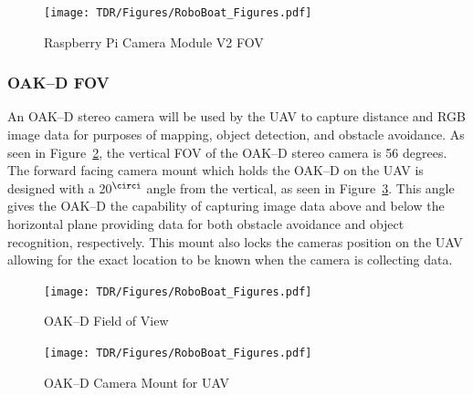 \documentclass[letterpaper, 12 pt, conference]{ieeeconf}
\begin{document}


\begin{figure}[tb]
\centering
\texttt{[image: TDR/Figures/RoboBoat\_Figures.pdf]}
\caption{Raspberry Pi Camera Module V2 FOV}
\label{fig:picamfov}
\end{figure}

\subsubsection{OAK--D FOV}
% 
An OAK--D stereo camera will be used by the UAV to capture distance and RGB image data for purposes of mapping, object detection, and obstacle avoidance. As seen in Figure~\ref{fig:oakdfov}, the vertical FOV of the OAK--D stereo camera is 56 degrees. The forward facing camera mount which holds the OAK--D on the UAV is designed with a 20$^{\circi}$ angle from the vertical, as seen in Figure~\ref{fig:cammount}. This angle gives the OAK--D the capability of capturing image data above and below the horizontal plane providing data for both obstacle avoidance and object recognition, respectively. This mount also locks the cameras position on the UAV allowing for the exact location to be known when the camera is collecting data.
%
\begin{figure}[tb]
\centering
\texttt{[image: TDR/Figures/RoboBoat\_Figures.pdf]}
\caption{OAK--D Field of View}
\label{fig:oakdfov}
\end{figure}
%
%
\begin{figure}[tb]
\centering
\texttt{[image: TDR/Figures/RoboBoat\_Figures.pdf]}
\caption{OAK--D Camera Mount for UAV}
\label{fig:cammount}
\end{figure}
%
\end{document}
